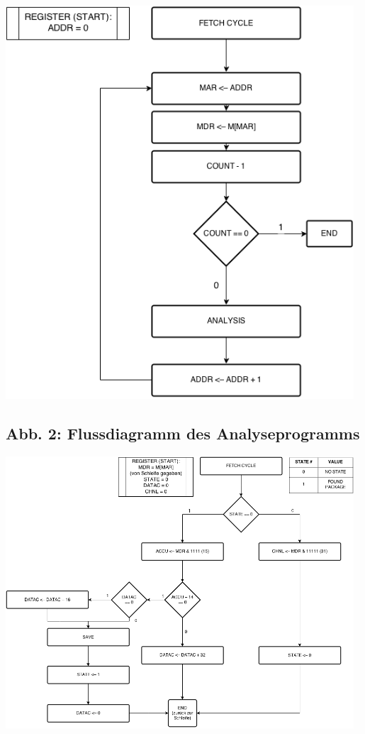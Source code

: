 \documentclass[12pt,titlepage]{article}
\begin{document}
\includegraphics[width=13cm]{readFromMemory.png}

\subsection{Abb. 2: Flussdiagramm des Analyseprogramms}
\includegraphics[width=13cm]{analyseData.png}
\end{document}
